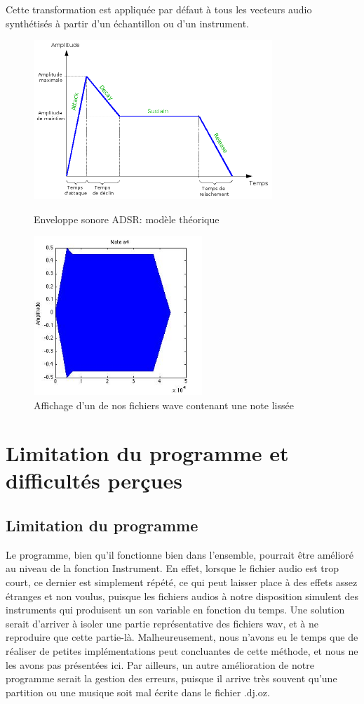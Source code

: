 \documentclass[10pt,a4paper]{article}
\begin{document}
Cette transformation est appliquée par défaut à tous les vecteurs audio synthétisés à partir d'un échantillon ou d'un instrument.

\begin{figure}[h!]
    \begin{minipage}[b]{0.4\linewidth}
        \centering \includegraphics[height=6cm]{images/ADSR.png}
        \caption{Enveloppe sonore ADSR: modèle théorique}
    \end{minipage}\hfill
    \begin{minipage}[b]{0.48\linewidth}
        \centering \includegraphics[height=6cm]{images/OurADSR.jpg}
        \caption{Affichage d'un de nos fichiers wave contenant une note lissée}
    \end{minipage}
\end{figure}

\section{Limitation du programme et difficultés perçues}
\subsection{Limitation du programme}
Le programme, bien qu'il fonctionne bien dans l'ensemble, pourrait être amélioré au niveau 
de la fonction Instrument. En effet, lorsque le fichier audio est trop court, ce dernier 
est simplement répété, ce qui peut laisser place à des effets assez étranges et non voulus,
puisque les fichiers audios à notre disposition simulent des instruments qui produisent
un son variable en fonction du temps. Une solution serait d'arriver à isoler une partie 
représentative des fichiers wav, et à ne reproduire que cette partie-là. Malheureusement, 
nous n'avons eu le temps que de réaliser de petites implémentations peut concluantes de 
cette méthode, et nous ne les avons pas présentées ici.
Par ailleurs, un autre amélioration de notre programme serait la gestion des erreurs, 
puisque il arrive très souvent qu'une partition ou une musique soit mal écrite dans le fichier .dj.oz.
\end{document}
